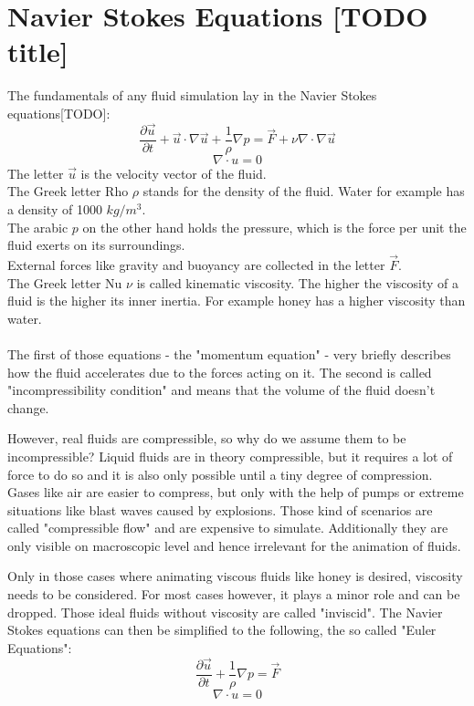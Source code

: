 \chapter{Navier Stokes Equations [TODO title]}\label{chapter:cudapressuresolver}

The fundamentals of any fluid simulation lay in the Navier Stokes equations[TODO]:\\
\begin{equation} \label{navier-stokes1}
	\frac{\partial \vec{u}}{\partial t} + \vec{u} \cdot \nabla \vec{u} + \frac{1}{\rho}  \nabla p = \vec{F} + \nu \nabla \cdot \nabla \vec{u}
\end{equation}
\begin{equation} \label{navier-stokes2}
	\nabla \cdot u = 0
\end{equation}
The letter $\vec{u}$ is the velocity vector of the fluid.\\
The Greek letter Rho $\rho$ stands for the density of the fluid. Water for example has a density of 1000 $kg/m^3$. \\
The arabic $p$ on the other hand holds the pressure, which is the force per unit the fluid exerts on its surroundings.\\
External forces like gravity and buoyancy are collected in the letter $\vec{F}$.\\
The Greek letter Nu $\nu$ is called kinematic viscosity. The higher the viscosity of a fluid is the higher its inner inertia. For example honey has a higher viscosity than water.\\\\
The first of those equations - the "momentum equation" - very briefly describes how the fluid accelerates due to the forces acting on it. The second is called "incompressibility condition" and means that the volume of the fluid doesn't change.
\par However, real fluids are compressible, so why do we assume them to be incompressible? Liquid fluids are in theory compressible, but it requires a lot of force to do so and it is also only possible until a tiny degree of compression. Gases like air are easier to compress, but only with the help of pumps or extreme situations like blast waves caused by explosions. Those kind of scenarios are called "compressible flow" and are expensive to simulate. Additionally they are only visible on macroscopic level and hence irrelevant for the animation of fluids.
\par Only in those cases where animating viscous fluids like honey is desired, viscosity needs to be considered. For most cases however, it plays a minor role and can be dropped. Those ideal fluids without viscosity are called "inviscid". The Navier Stokes equations can then be simplified to the following, the so called "Euler Equations":
\begin{equation} \label{navier-stokes12}
	\frac{\partial \vec{u}}{\partial t} + \frac{1}{\rho}  \nabla p = \vec{F}
\end{equation}
\begin{equation} \label{navier-stokes22}
	\nabla \cdot u = 0
\end{equation}

